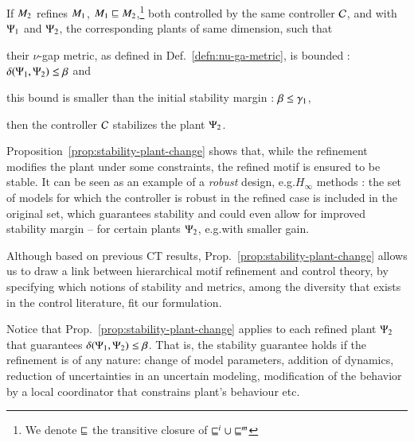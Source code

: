 \documentclass[runningheads]{llncs}
\makeatletter
\newenvironment{textlist}{\begin{enumerate*}[label=(\emph{\roman*})]}{\end{enumerate*}}
\newcommand{\defn}[1]{Def.~\ref{defn:#1}}
\newcommand{\prop}[1]{Prop.~\ref{prop:#1}}
\newcommand{\Prop}[1]{Proposition~\ref{prop:#1}}
\newcommand{\eg}[1][\@ ]{e.g.{#1}}
\newcommand{\etc}[1][\@ ]{etc.{#1}}
\newcommand{\abstracts}[1][]{\sqsubseteq\ifx#1\relax\else^{#1}\fi}
\newcommand{\isrefinedby}{\abstracts}
\newcommand{\motif}[1][]{M\ifx#1\relax\else^{#1}\fi}
\newcommand{\plant}[1][]{\Psi\ifx#1\relax\else^{#1}\fi}
\newcommand{\controller}[1][]{\mathcal{C}\ifx#1\relax\else^{#1}\fi}
\newcommand{\margin}[1][]{\gamma\ifx#1\relax\else^{#1}\fi}
\makeatother
\begin{document}
\begin{proposition}
\label{prop:stability-plant-change}
If 
$\motif_2$ refines $\motif_1$,  
$\motif_1 \isrefinedby \motif_2$,\footnote{%
%
We denote $\isrefinedby$ the transitive closure of $\isrefinedby[i] \cup \isrefinedby[m]$
%
} both controlled by the same controller \( \controller \),
and with $\plant_1$ and $\plant_2$, the corresponding plants of same dimension,
such that 
\begin{textlist}
    \item  their \(\nu\)-gap metric, as defined in \defn{nu-ga-metric}, is bounded :
$ \delta(\plant_1,\plant_2) \leq \beta$
and 
\item this bound is smaller than the initial stability margin : \(\beta \leq \margin_1\),
\end{textlist}
then
the controller \(\controller\) stabilizes the plant \(\plant_2\). 
\end{proposition}

\Prop{stability-plant-change} shows that, while the refinement 
modifies the plant under some constraints,
the refined motif is ensured to be stable. It can be seen as an example of a {\em robust} design, \eg $H_{\infty}$ methods \cite{zhou1998essentials}: the set of models for which the controller is robust in the refined case is included in the original set, which guarantees stability and could even allow for improved stability margin -- for certain plants $\plant_2$, \eg with smaller gain.

Although based on previous CT results, \prop{stability-plant-change} allows us to draw a link between hierarchical motif refinement and control theory, by specifying which notions of stability and metrics, among the diversity that exists in the control literature, fit our formulation. 

%
Notice that \prop{stability-plant-change} applies to each refined plant \(\plant_2\) that guarantees \( \delta(\plant_1,\plant_2) \leq \beta\). That is, the stability guarantee holds if the refinement is of any nature: change of model parameters, addition of dynamics, reduction of uncertainties in an uncertain modeling, modification of the behavior by a local coordinator that constrains plant's behaviour \etc
\end{document}
